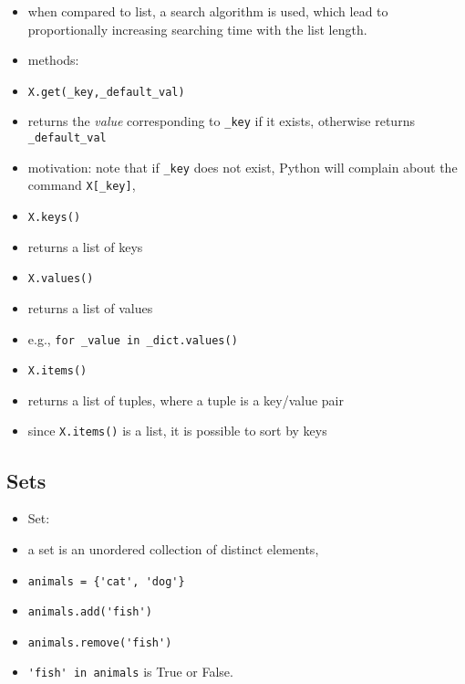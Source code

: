 \documentclass[onecolumn]{IEEEtran} %
\begin{document}
\begin{itemize}
        \item when compared to list, a search algorithm is used, which lead to proportionally increasing searching time with the list length.
    \ei
    \item methods:
    \bi
        \item \verb|X.get(_key,_default_val)|
        \bi
            \item returns the \emph{value} corresponding to \verb|_key| if it exists, otherwise returns \verb|_default_val|
            \item motivation: note that if \verb|_key| does not exist, Py\-thon will complain about the command \verb|X[_key]|,
        \ei
        \item \verb|X.keys()|
        \bi
            \item returns a list of keys
        \ei
        \item \verb|X.values()|
        \bi
            \item returns a list of values
            \item e.g., \verb|for _value in _dict.values()|
        \ei
        \item \verb|X.items()|
        \bi
            \item returns a list of tuples, where a tuple is a key/value pair
            \item since \verb|X.items()| is a list, it is possible to sort by keys
        \ei
    \ei
\end{itemize}

\subsection{Sets\label{sets_sec}}
\begin{itemize}
    \item Set:
    \bi
        \item a set is an unordered collection of distinct elements,
        \item \verb|animals = {'cat', 'dog'}|
        \item \verb|animals.add('fish')|
        \item \verb|animals.remove('fish')|
        \item \verb|'fish' in animals| is True or False.
    \ei
\end{itemize}
\end{document}
